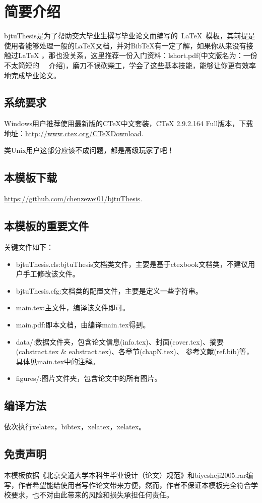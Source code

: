 \chapter{简要介绍}
bjtuThesis是为了帮助交大毕业生撰写毕业论文而编写的~\LaTeX{}~模板，其前提是使用者能够处理一般的LaTeX文档，并对BibTeX有一定了解，如果你从来没有接触过LaTeX ，那也没关系，这里推荐一份入门资料：lshort.pdf(中文版名为：一份不太简短的~\LaTeXe{}~ 介绍)，磨刀不误砍柴工，学会了这些基本技能，能够让你更有效率地完成毕业论文。
\section{系统要求}
Windows用户推荐使用最新版的CTeX中文套装，CTeX 2.9.2.164 Full版本，下载地址：\url{http://www.ctex.org/CTeXDownload}.\par
类Unix用户这部分应该不成问题，都是高级玩家了吧！
\section{本模板下载}
\url{https://github.com/chenzewei01/bjtuThesis}.
\section{本模板的重要文件}
关键文件如下：
\begin{itemize}
  \item bjtuThesis.cls:bjtuThesis文档类文件，主要是基于ctexbook文档类，不建议用户手工修改该文件。
  \item bjtuThesis.cfg:文档类的配置文件，主要是定义一些字符串。
  \item main.tex:主文件，编译该文件即可。
  \item main.pdf:即本文档，由编译main.tex得到。
  \item data/:数据文件夹，包含论文信息(info.tex)、封面(cover.tex)、摘要(cabstract.tex \& eabstract.tex)、各章节(chapN.tex)、 参考文献(ref.bib)等，具体见main.tex中的注释。
  \item figures/:图片文件夹，包含论文中的所有图片。

\end{itemize}
\section{编译方法}
依次执行xelatex，bibtex，xelatex，xelatex。
\section{免责声明}
本模板依据《北京交通大学本科生毕业设计（论文）规范》和biyesheji2005.rar编写，作者希望能给使用者写作论文带来方便，然而，作者不保证本模板完全符合学校要求，也不对由此带来的风险和损失承担任何责任。
